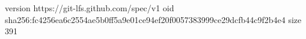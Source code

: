 version https://git-lfs.github.com/spec/v1
oid sha256:fc4256ea6c2554ae5b0ff5a9e01ce94ef20f0057383999ce29dcfb44c9f2b4e4
size 391
